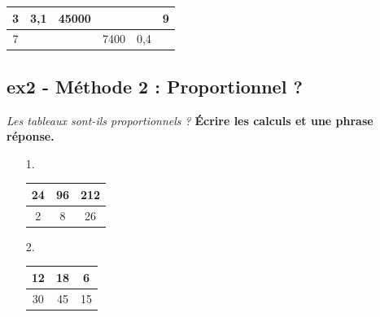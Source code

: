 \begin{center}
  \begin{tabular}{|c|c|c|c|c|c|}
    \hline
   3 &  3,1                   &                  45000 &  \phantom{100 000 000} &  \phantom{100 000 000} &                     9\\ \hline
   7 &  \phantom{100 000 000} &  \phantom{100 000 000} &                   7400 &                    0,4 &  \phantom{100 000 000}\\ \hline     
  \end{tabular}
\end{center}
\Pointilles[5]

\subsection*{ex2 - Méthode 2 : Proportionnel ?}
\textit{Les tableaux sont-ils proportionnels ? } \newline
\textbf{Écrire les calculs et une phrase réponse.}

\begin{minipage}[t]{0.2\textwidth}
  \begin{enumerate}
    \item[1.]
    \begin{tabular}{|c|c|c|}
      \hline
      24 & 96 & 212 \\  \hline
      2 & 8 & 26\\  \hline
    \end{tabular}
  \item[2.]
    \begin{tabular}{|c|c|c|}
      \hline
      12 & 18 & 6 \\  \hline
      30 & 45 & 15\\  \hline
    \end{tabular}
  \end{enumerate}
\end{minipage}
\begin{minipage}[t]{0.8\textwidth}
  \Pointilles[6]
\end{minipage}

